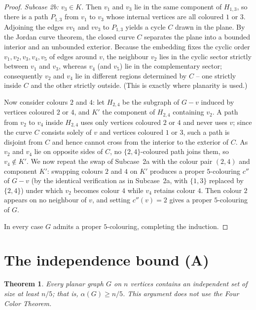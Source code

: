 \documentclass{amsart}
\newtheorem{theorem}{Theorem}
\theoremstyle{remark}
\begin{document}
\begin{proof}
\emph{Subcase 2b: $v_3\in K$.} Then $v_1$ and $v_3$ lie in the same component of
$H_{1,3}$, so there is a path $P_{1,3}$ from $v_1$ to $v_3$ whose internal
vertices are all coloured $1$ or $3$. Adjoining the edges $vv_1$ and $vv_3$ to
$P_{1,3}$ yields a cycle $C$ drawn in the plane. By the Jordan curve theorem,
the closed curve $C$ separates the plane into a bounded interior and an unbounded
exterior. Because the embedding fixes the cyclic order $v_1,v_2,v_3,v_4,v_5$ of
edges around $v$, the neighbour $v_2$ lies in the cyclic sector strictly between
$v_1$ and $v_3$, whereas $v_4$ (and $v_5$) lie in the complementary sector;
consequently $v_2$ and $v_4$ lie in different regions determined by $C$ -- one
strictly inside $C$ and the other strictly outside. (This is exactly where
planarity is used.)

Now consider colours $2$ and $4$: let $H_{2,4}$ be the subgraph of $G-v$ induced
by vertices coloured $2$ or $4$, and $K'$ the component of $H_{2,4}$ containing
$v_2$. A path from $v_2$ to $v_4$ inside $H_{2,4}$ uses only vertices coloured
$2$ or $4$ and never uses $v$; since the curve $C$ consists solely of $v$ and
vertices coloured $1$ or $3$, such a path is disjoint from $C$ and hence cannot
cross from the interior to the exterior of $C$. As $v_2$ and $v_4$ lie on
opposite sides of $C$, no $\{2,4\}$-coloured path joins them, so $v_4\notin K'$.
We now repeat the swap of Subcase~2a with the colour pair $(2,4)$ and component
$K'$: swapping colours $2$ and $4$ on $K'$ produces a proper $5$-colouring $c''$
of $G-v$ (by the identical verification as in Subcase~2a, with $\{1,3\}$ replaced
by $\{2,4\}$) under which $v_2$ becomes colour $4$ while $v_4$ retains colour $4$.
Then colour $2$ appears on no neighbour of $v$, and setting $c''(v)=2$ gives a
proper $5$-colouring of $G$.

In every case $G$ admits a proper $5$-colouring, completing the induction.
\end{proof}

\section{The independence bound (A)}

\begin{theorem}\label{thm:main}
Every planar graph $G$ on $n$ vertices contains an independent set of size at
least $n/5$; that is, $\alpha(G)\ge n/5$. This argument does not use the Four
Color Theorem.
\end{theorem}
\end{document}
